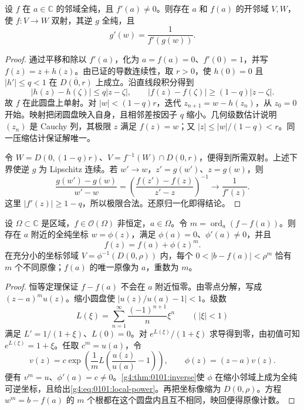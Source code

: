 \begin{theorem}[全纯逆函数定理]
	\label{g4:thm:0101:inverse}
	设 \(f\) 在 \(a\in\mathbb C\) 的邻域全纯，且 \(f'(a)\ne0\)。则存在 \(a\) 和 \(f(a)\) 的开邻域 \(V,W\)，使 \(f:V\to W\) 双射，其逆 \(g\) 全纯，且
	\[
		g'(w)=\frac1{f'(g(w))}.
	\]
\end{theorem}
\begin{proof}
	通过平移和除以 \(f'(a)\)，化为 \(a=f(a)=0\)、\(f'(0)=1\)，并写 \(f(z)=z+h(z)\)。由已证的导数连续性，取 \(r>0\)，使 \(h(0)=0\) 且 \(|h'|\le q<1\) 在 \(\overline{D(0,r)}\) 上成立。沿直线段积分得到
	\[
		|h(z)-h(\zeta)|\le q|z-\zeta|,\qquad
		|f(z)-f(\zeta)|\ge(1-q)|z-\zeta|.
	\]
	故 \(f\) 在此圆盘上单射。对 \(|w|<(1-q)r\)，迭代 \(z_{n+1}=w-h(z_n)\)，从 \(z_0=0\) 开始。映射把闭圆盘映入自身，且相邻差按因子 \(q\) 缩小。几何级数估计说明 \((z_n)\) 是 Cauchy 列，其极限 \(z\) 满足 \(f(z)=w\)；又 \(|z|\le |w|/(1-q)<r\)。同一压缩估计保证解唯一。

	令 \(W=D(0,(1-q)r)\)、\(V=f^{-1}(W)\cap D(0,r)\)，便得到所需双射。上述下界使逆 \(g\) 为 Lipschitz 连续。若 \(w'\to w\)，\(z'=g(w')\)、\(z=g(w)\)，则
	\[
		\frac{g(w')-g(w)}{w'-w}
		=\left(\frac{f(z')-f(z)}{z'-z}\right)^{-1}
		\longrightarrow\frac1{f'(z)}.
	\]
	这里 \(|f'(z)|\ge1-q\)，所以极限合法。还原归一化即得结论。
\end{proof}

\begin{theorem}
	\label{g4:thm:0101:local-power}
	设 \(\Omega\subset\mathbb C\) 是区域，\(f\in\mathcal O(\Omega)\) 非恒定，\(a\in\Omega\)。令 \(m=\operatorname{ord}_a(f-f(a))\)。则存在 \(a\) 附近的全纯坐标 \(w=\phi(z)\)，满足 \(\phi(a)=0\)、\(\phi'(a)\ne0\)，并且
	\begin{equation}
		\label{g4:eq:0101:local-power}
		f(z)=f(a)+\phi(z)^m.
	\end{equation}
	在充分小的坐标邻域 \(V=\phi^{-1}(D(0,\rho))\) 内，每个 \(0<|b-f(a)|<\rho^m\) 恰有 \(m\) 个不同原像；\(f(a)\) 的唯一原像为 \(a\)，重数为 \(m\)。
\end{theorem}
\begin{proof}
	恒等定理保证 \(f-f(a)\) 不会在 \(a\) 附近恒零。由零点分解，写成 \((z-a)^m u(z)\)。缩小圆盘使 \(|u(z)/u(a)-1|<1\)。级数
	\[
		L(\xi)=\sum_{n=1}^\infty\frac{(-1)^{n+1}}n\xi^n\qquad(|\xi|<1)
	\]
	满足 \(L'=1/(1+\xi)\)、\(L(0)=0\)。对 \(e^{L(\xi)}/(1+\xi)\) 求导得到零，由初值可知 \(e^{L(\xi)}=1+\xi\)。任取 \(c^m=u(a)\)，令
	\[
		v(z)=c\exp\left(\frac1m L\left(\frac{u(z)}{u(a)}-1\right)\right),\qquad
		\phi(z)=(z-a)v(z).
	\]
	便有 \(v^m=u\)、\(\phi'(a)=c\ne0\)。\cref{g4:thm:0101:inverse}使 \(\phi\) 在缩小邻域上成为全纯可逆坐标，且给出\eqref{g4:eq:0101:local-power}。再把坐标像缩为 \(D(0,\rho)\)。方程 \(w^m=b-f(a)\) 的 \(m\) 个根都在这个圆盘内且互不相同，映回便得原像计数。
\end{proof}

